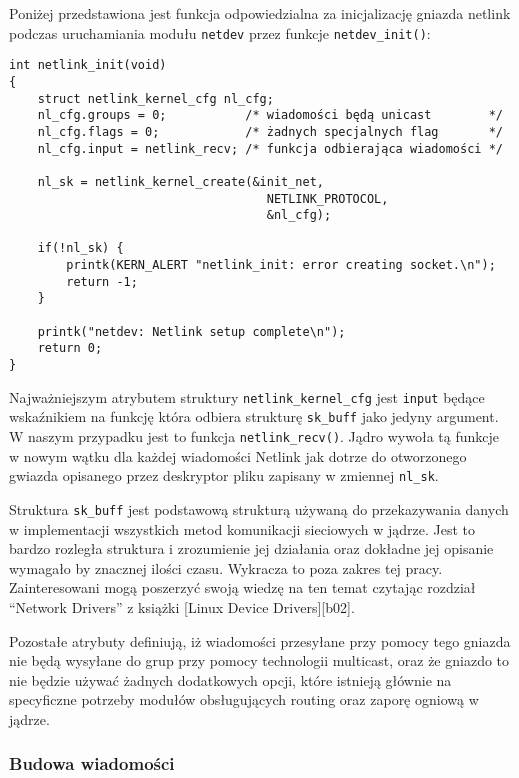 \documentclass[10pt]{article}
\begin{document}
Poniżej przedstawiona jest funkcja odpowiedzialna za inicjalizację gniazda netlink podczas uruchamiania modułu \texttt{netdev} przez funkcje \texttt{netdev\_init()}:

\begin{verbatim}
int netlink_init(void)
{
    struct netlink_kernel_cfg nl_cfg;
    nl_cfg.groups = 0;           /* wiadomości będą unicast        */
    nl_cfg.flags = 0;            /* żadnych specjalnych flag       */
    nl_cfg.input = netlink_recv; /* funkcja odbierająca wiadomości */

    nl_sk = netlink_kernel_create(&init_net,
                                    NETLINK_PROTOCOL,
                                    &nl_cfg);

    if(!nl_sk) {
        printk(KERN_ALERT "netlink_init: error creating socket.\n");
        return -1;
    }

    printk("netdev: Netlink setup complete\n");
    return 0;
}
\end{verbatim}

Najważniejszym atrybutem struktury \texttt{netlink\_kernel\_cfg} jest \texttt{input} będące wskaźnikiem na funkcję która odbiera strukturę \texttt{sk\_buff} jako jedyny argument. W naszym przypadku jest to funkcja \texttt{netlink\_recv()}. Jądro wywoła tą funkcje w nowym wątku dla każdej wiadomości Netlink jak dotrze do otworzonego gwiazda opisanego przez deskryptor pliku zapisany w zmiennej \texttt{nl\_sk}.

Struktura \texttt{sk\_buff} jest podstawową strukturą używaną do przekazywania danych w implementacji wszystkich metod komunikacji sieciowych w jądrze. Jest to bardzo rozległa struktura i zrozumienie jej działania oraz dokładne jej opisanie wymagało by znacznej ilości czasu.  Wykracza to poza zakres tej pracy. Zainteresowani mogą poszerzyć swoją wiedzę na ten temat czytając rozdział ``Network Drivers'' z książki {[}Linux Device Drivers{]}{[}b02{]}.

Pozostałe atrybuty definiują, iż wiadomości przesyłane przy pomocy tego gniazda nie będą wysyłane do grup przy pomocy technologii multicast, oraz że gniazdo to nie będzie używać żadnych dodatkowych opcji, które istnieją głównie na specyficzne potrzeby modułów obsługujących routing oraz zaporę ogniową w jądrze.

\subsubsection{Budowa wiadomości}
\end{document}
